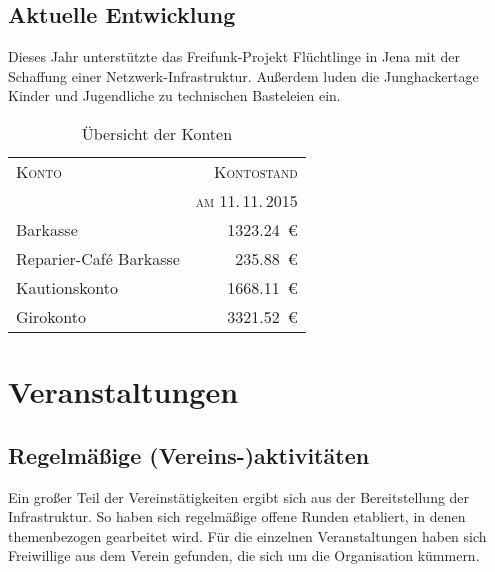 \documentclass[ngerman]{scrartcl}
\begin{document}
\subsection{Aktuelle Entwicklung}

Dieses Jahr unterstützte das Freifunk-Projekt Flüchtlinge in Jena mit der Schaffung einer Netzwerk-Infrastruktur.
Außerdem luden die Junghackertage Kinder und Jugendliche zu technischen Basteleien ein.

\begin{table}[h!]
	\centering{}
	\begin{tabular}{l|r}
	\toprule
	\textsc{Konto} & \textsc{Kontostand} \\
	& \textsc{am 11.\,11.\,2015} \\
	\midrule
	Barkasse & \num{1323,24}~\euro{} \\
	Reparier-Café Barkasse & \num{235,88}~\euro{} \\
	Kautionskonto & \num{1668,11}~\euro{} \\
	Girokonto & \num{3321,52}~\euro{}\\
	\bottomrule
	\end{tabular}
\caption{Übersicht der Konten}
\end{table}


\section{Veranstaltungen}

\subsection{Regelmäßige (Vereins-)aktivitäten}

Ein großer Teil der Vereinstätigkeiten ergibt sich aus der
Bereitstellung der Infrastruktur. So haben sich regelmäßige offene Runden
etabliert, in denen themenbezogen gearbeitet wird. Für die
einzelnen Veranstaltungen haben sich Freiwillige aus dem Verein
gefunden, die sich um die Organisation kümmern.
\end{document}
